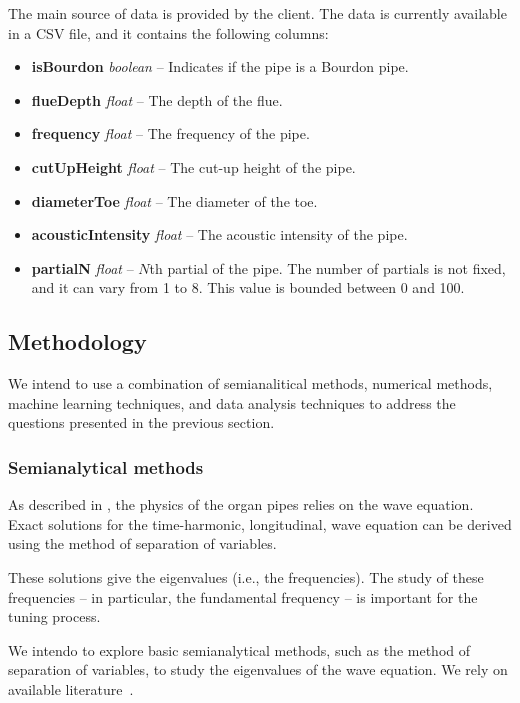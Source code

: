 \documentclass{psu-plan}
\begin{document}
The main source of data is provided by the client.
The data is currently available in a CSV file, and it contains the following
columns:
\begin{itemize}
    \item \textbf{isBourdon} \textit{boolean} -- Indicates if the pipe is a Bourdon pipe.
    \item \textbf{flueDepth} \textit{float} -- The depth of the flue.
    \item \textbf{frequency} \textit{float} -- The frequency of the pipe.
    \item \textbf{cutUpHeight} \textit{float} -- The cut-up height of the pipe.
    \item \textbf{diameterToe} \textit{float} -- The diameter of the toe.
    \item \textbf{acousticIntensity} \textit{float} -- The acoustic intensity of the pipe.
    \item \textbf{partialN} \textit{float} -- \(N\)th partial of the pipe.
        The number of partials is not fixed, and it can vary from 1 to 8.
        This value is bounded between 0 and 100.
\end{itemize}


\subsection{Methodology}

We intend to use a combination of semianalitical methods, numerical methods,
machine learning techniques, and data analysis techniques to address the
questions presented in the previous section.

\subsubsection{Semianalytical methods}

As described in \autocite{2004RosFle-1}, the physics of the organ pipes relies
on the wave equation.
Exact solutions for the time-harmonic, longitudinal, wave equation can be
derived using the method of separation of variables.

These solutions give the eigenvalues (i.e., the frequencies). 
The study of these frequencies -- in particular, the fundamental
frequency -- is important for the tuning process.

We intendo to explore basic semianalytical methods, such as the method of
separation of variables, to study the eigenvalues of the wave equation.
We rely on available literature~\autocite{2004RosFle-1, 2012RosFle-1}.
\end{document}
